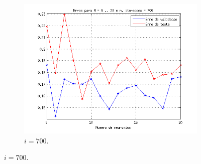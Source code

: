 \begin{figure}[H]
\begin{subfigure}{.33\textwidth}
				  \includegraphics[width=1\linewidth]{image/mlp_700_iterations}
				  \caption{\(i=700\).}
				\end{subfigure}%
			

\end{figure}
